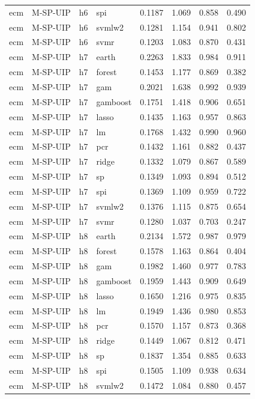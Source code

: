 \begin{ThreePartTable}
\begin{longtable}[t]{llclcccc}
ecm & M-SP-UIP & h6 & spi & 0.1187 & 1.069 & 0.858 & 0.490\\
ecm & M-SP-UIP & h6 & svmlw2 & 0.1281 & 1.154 & 0.941 & 0.802\\
ecm & M-SP-UIP & h6 & svmr & 0.1203 & 1.083 & 0.870 & 0.431\\
\addlinespace
ecm & M-SP-UIP & h7 & earth & 0.2263 & 1.833 & 0.984 & 0.911\\
ecm & M-SP-UIP & h7 & forest & 0.1453 & 1.177 & 0.869 & 0.382\\
ecm & M-SP-UIP & h7 & gam & 0.2021 & 1.638 & 0.992 & 0.939\\
ecm & M-SP-UIP & h7 & gamboost & 0.1751 & 1.418 & 0.906 & 0.651\\
ecm & M-SP-UIP & h7 & lasso & 0.1435 & 1.163 & 0.957 & 0.863\\
ecm & M-SP-UIP & h7 & lm & 0.1768 & 1.432 & 0.990 & 0.960\\
ecm & M-SP-UIP & h7 & pcr & 0.1432 & 1.161 & 0.882 & 0.437\\
ecm & M-SP-UIP & h7 & ridge & 0.1332 & 1.079 & 0.867 & 0.589\\
ecm & M-SP-UIP & h7 & sp & 0.1349 & 1.093 & 0.894 & 0.512\\
ecm & M-SP-UIP & h7 & spi & 0.1369 & 1.109 & 0.959 & 0.722\\
ecm & M-SP-UIP & h7 & svmlw2 & 0.1376 & 1.115 & 0.875 & 0.654\\
ecm & M-SP-UIP & h7 & svmr & 0.1280 & 1.037 & 0.703 & 0.247\\
\addlinespace
ecm & M-SP-UIP & h8 & earth & 0.2134 & 1.572 & 0.987 & 0.979\\
ecm & M-SP-UIP & h8 & forest & 0.1578 & 1.163 & 0.864 & 0.404\\
ecm & M-SP-UIP & h8 & gam & 0.1982 & 1.460 & 0.977 & 0.783\\
ecm & M-SP-UIP & h8 & gamboost & 0.1959 & 1.443 & 0.909 & 0.649\\
ecm & M-SP-UIP & h8 & lasso & 0.1650 & 1.216 & 0.975 & 0.835\\
ecm & M-SP-UIP & h8 & lm & 0.1949 & 1.436 & 0.980 & 0.853\\
ecm & M-SP-UIP & h8 & pcr & 0.1570 & 1.157 & 0.873 & 0.368\\
ecm & M-SP-UIP & h8 & ridge & 0.1449 & 1.067 & 0.812 & 0.471\\
ecm & M-SP-UIP & h8 & sp & 0.1837 & 1.354 & 0.885 & 0.633\\
ecm & M-SP-UIP & h8 & spi & 0.1505 & 1.109 & 0.938 & 0.634\\
ecm & M-SP-UIP & h8 & svmlw2 & 0.1472 & 1.084 & 0.880 & 0.457\\

\end{longtable}
\end{ThreePartTable}
